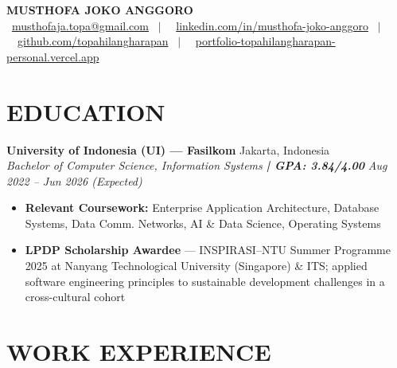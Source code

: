 \documentclass[10pt,a4paper]{article}
\newcommand{\contactline}[1]{\small #1}
\newcommand{\experienceheader}[4]{
    \textbf{#1} \hfill #2 \\
    \textit{#3} \hfill \textit{#4}
}
\begin{document}
\begin{center}
    {\LARGE \textbf{MUSTHOFA JOKO ANGGORO}} \\[2pt]
    \contactline{
        \faEnvelope\ \href{mailto:musthofaja.topa@gmail.com}{musthofaja.topa@gmail.com} \ $|$ \ 
        \faLinkedin\ \href{https://www.linkedin.com/in/musthofa-joko-anggoro/}{linkedin.com/in/musthofa-joko-anggoro} \ $|$ \
        \faGithub\ \href{https://github.com/topahilangharapan}{github.com/topahilangharapan} \ $|$ \
        \faGlobe\ \href{https://portfolio-topahilangharapan-personal.vercel.app/}{portfolio-topahilangharapan-personal.vercel.app}
    }
\end{center}

\vspace{-8pt}

\section*{EDUCATION}

\experienceheader{University of Indonesia (UI) — Fasilkom}{Jakarta, Indonesia}{Bachelor of Computer Science, Information Systems \textbf{| GPA: 3.84/4.00}}{Aug 2022 -- Jun 2026 (Expected)}
\begin{itemize}[leftmargin=*, itemsep=0.5pt, topsep=1pt]
    \item \textbf{Relevant Coursework:} Enterprise Application Architecture, Database Systems, Data Comm. Networks, AI \& Data Science, Operating Systems
    \item \textbf{LPDP Scholarship Awardee} — INSPIRASI--NTU Summer Programme 2025 at Nanyang Technological University (Singapore) \& ITS; applied software engineering principles to sustainable development challenges in a cross-cultural cohort
\end{itemize}

\vspace{-4pt}

\section*{WORK EXPERIENCE}
\end{document}
